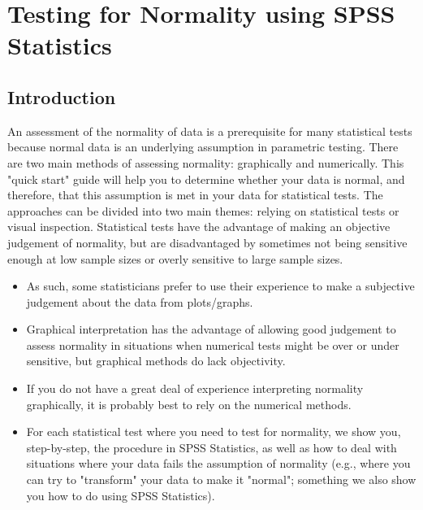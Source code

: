 \documentclass[]{article}
\begin{document}

\section{Testing for Normality using SPSS Statistics}

\subsection{Introduction}
An assessment of the normality of data is a prerequisite for many statistical tests because normal data is an underlying assumption in parametric testing. There are two main methods of assessing normality: graphically and numerically.
This "quick start" guide will help you to determine whether your data is normal, and therefore, that this assumption is met in your data for statistical tests. The approaches can be divided into two main themes: relying on statistical tests or visual inspection. Statistical tests have the advantage of making an objective judgement of normality, but are disadvantaged by sometimes not being sensitive enough at low sample sizes or overly sensitive to large sample sizes. 
\begin{itemize}
\item As such, some statisticians prefer to use their experience to make a subjective judgement about the data from plots/graphs. 
\item Graphical interpretation has the advantage of allowing good judgement to assess normality in situations when numerical tests might be over or under sensitive, but graphical methods do lack objectivity. 
\item If you do not have a great deal of experience interpreting normality graphically, it is probably best to rely on the numerical methods.
\item  For each statistical test where you need to test for normality, we show you, step-by-step, the procedure in SPSS Statistics, as well as how to deal with situations where your data fails the assumption of normality (e.g., where you can try to "transform" your data to make it "normal"; something we also show you how to do using SPSS Statistics). 
\end{itemize}
\end{document}
